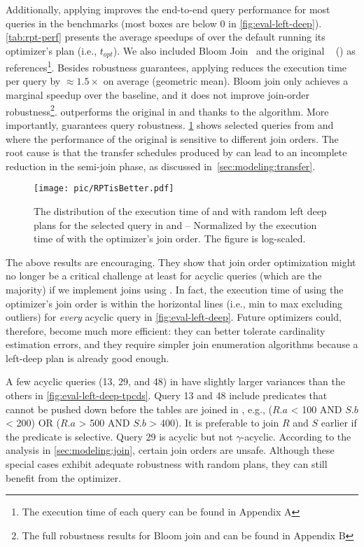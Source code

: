 Additionally, applying \rpt improves the end-to-end query performance for most queries in the benchmarks (most \rpt boxes are below 0 in \cref{fig:eval-left-deep}). \cref{tab:rpt-perf} presents the average speedups of \rpt over the default \duckdb running its optimizer's plan (i.e., $t_{opt}$). We also included Bloom Join~\cite{bloomjoin} and the original \PT~\cite{yang2023PT} (\pt) as references\footnote{The execution time of each query can be found in Appendix A}. Besides robustness guarantees, applying \rpt reduces the execution time per query by $\approx1.5\times$ on average (geometric mean). Bloom join only achieves a marginal speedup over the baseline, and it does not improve join-order robustness\footnote{The full robustness results for Bloom join and \pt can be found in Appendix B}. \rpt outperforms the original \pt in \tpcds and \dsb thanks to the \texttt{\TreeStruct} algorithm. More importantly, \rpt guarantees query robustness. \cref{fig:RPTisBetter} shows selected queries from \job and \tpcds where the performance of the original \pt is sensitive to different join orders. The root cause is that the transfer schedules produced by \pt can lead to an incomplete reduction in the semi-join phase, as discussed in~\cref{sec:modeling:transfer}.

\begin{figure}[t!]
    \centering
    \texttt{[image: pic/RPTisBetter.pdf]}
    \caption{The distribution of the execution time of \pt and \rpt with random left deep plans for the selected query in \job and \tpcds \textnormal{-- Normalized by the execution time of \rpt with the optimizer's join order. The figure is log-scaled.}}
    \label{fig:RPTisBetter}
\end{figure}

The above results are encouraging. They show that join order optimization might no longer be a critical challenge at least for acyclic queries (which are the majority) if we implement joins using \rpt. In fact, the execution time of \rpt using the optimizer's join order is within the horizontal lines (i.e., min to max excluding outliers) for \emph{every} acyclic query in \cref{fig:eval-left-deep}. Future optimizers could, therefore, become much more efficient: they can better tolerate cardinality estimation errors, and they require simpler join enumeration algorithms because a left-deep plan is already good enough. 

A few acyclic queries (13, 29, and 48) in \tpcds have slightly larger variances than the others in \cref{fig:eval-left-deep-tpcds}. Query 13 and 48 include predicates that cannot be pushed down before the tables are joined in \duckdb, e.g., ($R.a$ < 100 AND $S.b$ < 200) OR ($R.a$ > 500 AND $S.b$ > 400). It is preferable to join $R$ and $S$ earlier if the predicate is selective. Query 29 is acyclic but not $\gamma$-acyclic. According to the analysis in \cref{sec:modeling:join}, certain join orders are unsafe. Although these special cases exhibit adequate robustness with random plans, they can still benefit from the optimizer.


